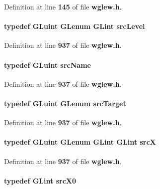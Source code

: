 Definition at line {\bf 145} of file {\bf wglew.\+h}.

\paragraph[{src\+Level}]{\setlength{\rightskip}{0pt plus 5cm}typedef {\bf G\+Luint} {\bf G\+Lenum} {\bf G\+Lint} {\bf src\+Level}}\label{wglew_8h_a1ccd2cfa403b29c73399f23ccad53f3d}


Definition at line {\bf 937} of file {\bf wglew.\+h}.

\paragraph[{src\+Name}]{\setlength{\rightskip}{0pt plus 5cm}typedef {\bf G\+Luint} {\bf src\+Name}}\label{wglew_8h_ae95485055152bdc10a16a3c9be97772c}


Definition at line {\bf 937} of file {\bf wglew.\+h}.

\paragraph[{src\+Target}]{\setlength{\rightskip}{0pt plus 5cm}typedef {\bf G\+Luint} {\bf G\+Lenum} {\bf src\+Target}}\label{wglew_8h_aa10fc2f8db3cadbe8c6b80450f8e79e4}


Definition at line {\bf 937} of file {\bf wglew.\+h}.

\paragraph[{srcX}]{\setlength{\rightskip}{0pt plus 5cm}typedef {\bf G\+Luint} {\bf G\+Lenum} {\bf G\+Lint} {\bf G\+Lint} {\bf srcX}}\label{wglew_8h_a7896a9003b7c800ce957fe0fedd70bfa}


Definition at line {\bf 937} of file {\bf wglew.\+h}.

\paragraph[{src\+X0}]{\setlength{\rightskip}{0pt plus 5cm}typedef {\bf G\+Lint} {\bf src\+X0}}\label{wglew_8h_ad0848d0ec103899d86c40a7858f27bb3}


